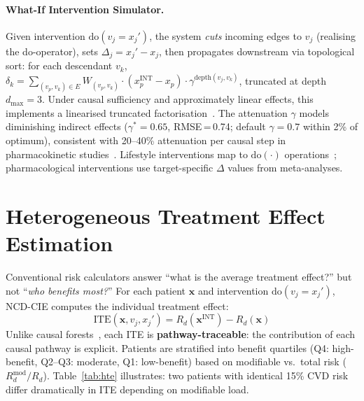 \documentclass[runningheads]{llncs}
\begin{document}
\paragraph{What-If Intervention Simulator.}
Given intervention $\mathrm{do}(v_j = x_j')$, the system
\emph{cuts} incoming edges to $v_j$ (realising the do-operator),
sets $\Delta_j = x_j' - x_j$, then propagates downstream via
topological sort: for each descendant $v_k$,
$\delta_k = \sum_{(v_p,v_k)\in E} W_{(v_p,v_k)} \cdot
(x_p^{\mathrm{INT}} - x_p) \cdot \gamma^{\text{depth}(v_j,v_k)}$,
truncated at depth $d_{\max}=3$.
Under causal sufficiency and approximately linear effects, this
implements a linearised truncated
factorisation~\cite{pearl2009causality}.
The attenuation $\gamma$ models diminishing indirect effects
($\gamma^* = 0.65$, RMSE\,=\,0.74; default $\gamma=0.7$ within
2\% of optimum), consistent with 20--40\% attenuation per causal
step in pharmacokinetic studies~\cite{ctt2010,pearl2009causality}.
Lifestyle interventions map to $\mathrm{do}(\cdot)$
operations~\cite{naci2019comparative}; pharmacological interventions
use target-specific $\Delta$ values from meta-analyses.

\section{Heterogeneous Treatment Effect Estimation}\label{sec:hte}

Conventional risk calculators answer ``what is the average treatment
effect?'' but not ``\emph{who benefits most?}''
For each patient $\mathbf{x}$ and intervention
$\mathrm{do}(v_j = x_j')$, NCD-CIE computes the individual treatment
effect:
\begin{equation}\label{eq:ite}
\mathrm{ITE}(\mathbf{x}, v_j, x_j') = R_d(\mathbf{x}^{\mathrm{INT}}) - R_d(\mathbf{x})
\end{equation}
Unlike causal forests~\cite{inoue2023causalforest}, each ITE is
\textbf{pathway-traceable}: the contribution of each causal pathway
is explicit.
Patients are stratified into benefit quartiles (Q4: high-benefit,
Q2--Q3: moderate, Q1: low-benefit) based on modifiable vs.\ total
risk ($R_d^{\mathrm{mod}} / R_d$).
Table~\ref{tab:hte} illustrates: two patients with identical 15\%
CVD risk differ dramatically in ITE depending on modifiable load.
\end{document}
